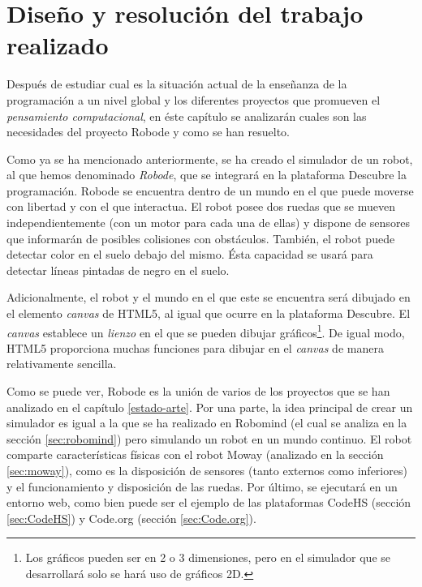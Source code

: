 \chapter{Diseño y resolución del trabajo realizado}
\label{diseno}

Después de estudiar cual es la situación actual de la enseñanza de la programación a un nivel global y los diferentes proyectos que promueven el \emph{pensamiento computacional}, en éste capítulo se analizarán cuales son las necesidades del proyecto Robode y como se han resuelto.

Como ya se ha mencionado anteriormente, se ha creado el simulador de un robot, al que hemos denominado \emph{Robode}, que se integrará en la plataforma Descubre la programación. Robode se encuentra dentro de un mundo en el que puede moverse con libertad y con el que interactua. El robot posee dos ruedas que se mueven independientemente (con un motor para cada una de ellas) y dispone de sensores que informarán de posibles colisiones con obstáculos. También, el robot puede detectar color en el suelo debajo del mismo. Ésta capacidad se usará para detectar líneas pintadas de negro en el suelo.

Adicionalmente, el robot y el mundo en el que este se encuentra será dibujado en el elemento \emph{canvas} de HTML5, al igual que ocurre en la plataforma Descubre. El \emph{canvas} establece un \emph{lienzo} en el que se pueden dibujar gráficos\footnote{Los gráficos pueden ser en 2 o 3 dimensiones, pero en el simulador que se desarrollará solo se hará uso de gráficos 2D.}. De igual modo, HTML5 proporciona muchas funciones para dibujar en el \emph{canvas} de manera relativamente sencilla.


Como se puede ver, Robode es la unión de varios de los proyectos que se han analizado en el capítulo \ref{estado-arte}. Por una parte, la idea principal de crear un simulador es igual a la que se ha realizado en Robomind (el cual se analiza en la sección \ref{sec:robomind}) pero simulando un robot en un mundo continuo. El robot comparte características físicas con el robot Moway (analizado en la sección \ref{sec:moway}), como es la disposición de sensores (tanto externos como inferiores) y el funcionamiento y disposición de las ruedas. Por último, se ejecutará en un entorno web, como bien puede ser el ejemplo de las plataformas CodeHS (sección \ref{sec:CodeHS}) y Code.org (sección \ref{sec:Code.org}). 


